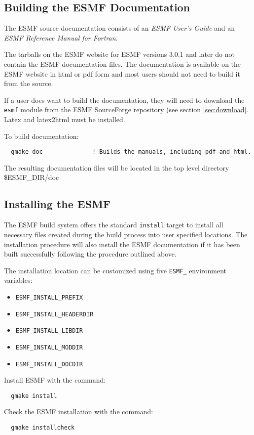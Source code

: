 \subsection{Building the ESMF Documentation}
\label{BuildDocumentation}

The ESMF source documentation consists of an {\it ESMF User's Guide}
and an {\it ESMF Reference Manual for Fortran}.

The tarballs on the ESMF website for ESMF versions 3.0.1 and later do
not contain the ESMF documentation files.  The documentation is 
available on the ESMF website in html or pdf form and most users should
not need to build it from the source.

If a user does want to build the documentation, they will need to 
download the {\tt esmf} module from the ESMF SourceForge repository
(see section \ref{sec:download}.  Latex and latex2html must be
installed.

\noindent To build documentation:
\begin{verbatim}
  gmake doc              ! Builds the manuals, including pdf and html.
\end{verbatim}

\noindent The resulting documentation files will be
located in the top level directory \${ESMF\_DIR}/doc

\subsection{Installing the ESMF}
\label{InstallESMF}

The ESMF build system offers the standard {\tt install} target to install all
necessary files created during the build process into user specified locations.
The installation procedure will also install the ESMF documentation if it has
been built successfully following the procedure outlined above.

The installation location can be customized using five {\tt ESMF\_} environment
variables:
\begin{itemize}
\item {\tt ESMF\_INSTALL\_PREFIX}
\item {\tt ESMF\_INSTALL\_HEADERDIR}
\item {\tt ESMF\_INSTALL\_LIBDIR}
\item {\tt ESMF\_INSTALL\_MODDIR}
\item {\tt ESMF\_INSTALL\_DOCDIR}
\end{itemize}

Install ESMF with the command:
\begin{verbatim}
  gmake install
\end{verbatim}

Check the ESMF installation with the command:
\begin{verbatim}
  gmake installcheck
\end{verbatim}

